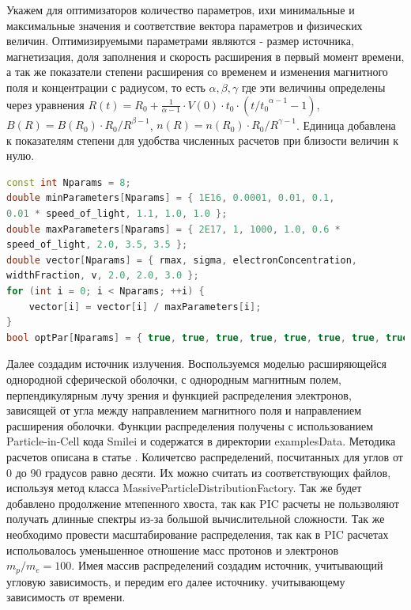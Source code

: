 Укажем для оптимизаторов количество параметров, ихи минимальные и максимальные значения и соответствие вектора параметров и физических величин. Оптимизируемыми параметрами являются - размер источника, магнетизация, доля заполнения и скорость расширения в первый момент времени, а так же показатели степени расширения со временем и изменения магнитного поля и концентрации с радиусом, то есть $\alpha, \beta, \gamma$ где эти величины определены через уравнения $R(t) = R_0 + \frac{1}{\alpha-1}\cdot V(0) \cdot t_0 \cdot ({t/t_0}^{\alpha-1}-1 )$, $B(R) = B(R_0)\cdot{R_0/R}^{\beta-1}$, $n(R) = n(R_0)\cdot{R_0/R}^{\gamma - 1}$. Единица добавлена к показателям степени для удобства численных расчетов при близости величин к нулю.
\begin{lstlisting}[language=c++]
const int Nparams = 8;
double minParameters[Nparams] = { 1E16, 0.0001, 0.01, 0.1, 
0.01 * speed_of_light, 1.1, 1.0, 1.0 };
double maxParameters[Nparams] = { 2E17, 1, 1000, 1.0, 0.6 * 
speed_of_light, 2.0, 3.5, 3.5 };
double vector[Nparams] = { rmax, sigma, electronConcentration, 
widthFraction, v, 2.0, 2.0, 3.0 };
for (int i = 0; i < Nparams; ++i) {
    vector[i] = vector[i] / maxParameters[i];
}
bool optPar[Nparams] = { true, true, true, true, true, true, true, true };
\end{lstlisting}

Далее создадим источник излучения. Воспользуемся моделью расширяющейся однородной сферической оболочки, с однородным магнитным полем, перпендикулярным лучу зрения и функцией распределения электронов, зависящей от угла между направлением магнитного поля и направлением расширения оболочки. Функции распределения получены с использованием Particle-in-Cell кода Smilei \cite{Derouillat} и содержатся в директории examplesData. Методика расчетов описана в статье \cite{BykovUnirse}. Количетсво распределений, посчитанных для углов от 0 до 90 градусов равно десяти. Их можно считать из соответствующих файлов, используя метод класса MassiveParticleDistributionFactory. Так же будет добавлено продолжение мтепенного хвоста, так как PIC расчеты не пользволяют получать длинные спектры из-за большой вычислительной сложности. Так же необходимо провести масштабирование распределения, так как в PIC расчетах испольовалось уменьшенное отношение масс протонов и электронов $m_p/m_e = 100$. Имея массив распределений создадим источник, учитывающий угловую зависимость, и передим его далее источнику. учитывающему зависимость от времени.

